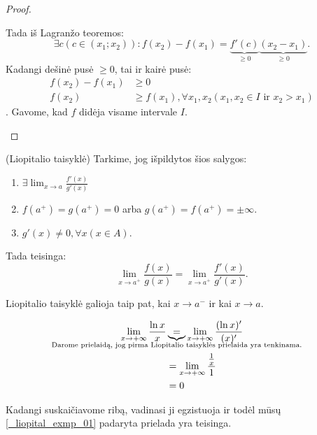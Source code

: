 \begin{prop}
\begin{proof}
\begin{description}
        Tada iš Lagranžo teoremos:
        \begin{equation*}
          \exists c (c \in (x_{1};x_{2})) : 
            f(x_{2}) - f(x_{1}) = 
            \underbrace{f'(c)}_{\geq 0}
            \underbrace{(x_{2} - x_{1})}_{\geq 0}.
        \end{equation*}
        Kadangi dešinė pusė $\geq 0$, tai ir kairė pusė:
        \begin{align*}
          f(x_{2}) - f(x_{1}) &\geq 0 \\
          f(x_{2}) &\geq f(x_{1}), \forall x_{1}, x_{2} 
            (x_{1}, x_{2} \in I \text{ ir } x_{2} > x_{1})
        \end{align*}.
        Gavome, kad $f$ didėja visame intervale $I$.

    \end{description}
  \end{proof}
\end{prop}

\begin{prop}
  (Liopitalio taisyklė) Tarkime, jog išpildytos šios salygos:
  \begin{enumerate}
    \item $\exists \lim _{x \to a} \frac{f'(x)}{g'(x)}$
    \item $f(a^{+}) = g(a^{+}) = 0$ arba 
      $g(a^{+}) = f(a^{+}) = \pm \infty$.
    \item $g'(x) \neq 0, \forall x (x \in A)$.
  \end{enumerate}

  Tada teisinga:
  \begin{equation*}
    \lim _{x \to a^{+}} \frac{f(x)}{g(x)} = 
    \lim _{x \to a^{+}} \frac{f'(x)}{g'(x)}.
  \end{equation*}
\end{prop}

\begin{note}
  Liopitalio taisyklė galioja taip pat, kai $x \to a^{-}$ ir kai 
  $x \to a$.
\end{note}

\begin{exmp}
  \begin{align}
    \lim _{x \to +\infty} \frac{\ln x}{x}
    &\underbrace{=}_{\mathclap{
      \text{Darome prielaidą, jog pirma Liopitalio taisyklės 
      prielaida yra tenkinama.}}}
    \lim _{x \to +\infty} \frac{(\ln x)'}{(x)'}
    \label{_liopital_exmp_01} \\
    &= \lim _{x \to +\infty} \frac{\frac{1}{x}}{1} \\
    &= 0
    \label{_liopital_exmp_02}
  \end{align}

  Kadangi suskaičiavome ribą, vadinasi ji egzistuoja ir todėl mūsų
  \ref{_liopital_exmp_01} padaryta prielada yra teisinga.
\end{exmp}
